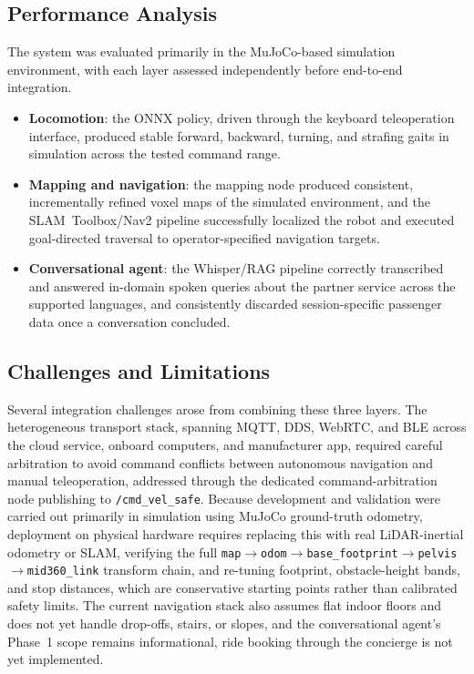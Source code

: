 \documentclass[10pt,twocolumn]{article}
\begin{document}
\subsection{Performance Analysis}
The system was evaluated primarily in the MuJoCo-based simulation environment, with each layer assessed independently before end-to-end integration.
\begin{itemize}[leftmargin=1.1em,itemsep=1pt,topsep=2pt]
\item \textbf{Locomotion}: the ONNX policy, driven through the keyboard teleoperation interface, produced stable forward, backward, turning, and strafing gaits in simulation across the tested command range.
\item \textbf{Mapping and navigation}: the mapping node produced consistent, incrementally refined voxel maps of the simulated environment, and the SLAM~Toolbox/Nav2 pipeline successfully localized the robot and executed goal-directed traversal to operator-specified navigation targets.
\item \textbf{Conversational agent}: the Whisper/RAG pipeline correctly transcribed and answered in-domain spoken queries about the partner service across the supported languages, and consistently discarded session-specific passenger data once a conversation concluded.
\end{itemize}

\subsection{Challenges and Limitations}
Several integration challenges arose from combining these three layers. The heterogeneous transport stack, spanning MQTT, DDS, WebRTC, and BLE across the cloud service, onboard computers, and manufacturer app, required careful arbitration to avoid command conflicts between autonomous navigation and manual teleoperation, addressed through the dedicated command-arbitration node publishing to \texttt{/cmd\_vel\_safe}. Because development and validation were carried out primarily in simulation using MuJoCo ground-truth odometry, deployment on physical hardware requires replacing this with real LiDAR-inertial odometry or SLAM, verifying the full \texttt{map}$\rightarrow$\texttt{odom}$\rightarrow$\texttt{base\_footprint}$\rightarrow$\texttt{pelvis}$\rightarrow$\texttt{mid360\_link} transform chain, and re-tuning footprint, obstacle-height bands, and stop distances, which are conservative starting points rather than calibrated safety limits. The current navigation stack also assumes flat indoor floors and does not yet handle drop-offs, stairs, or slopes, and the conversational agent's Phase~1 scope remains informational, ride booking through the concierge is not yet implemented.
\end{document}

